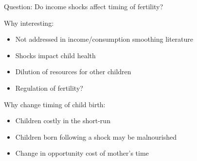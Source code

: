 \documentclass[red]{beamer}
\begin{document}
\begin{frame}{Question: Do income shocks affect timing of fertility?}

Why interesting:
\begin{itemize}
\item Not addressed in  income/consumption smoothing literature 
\item Shocks impact child health
\item Dilution of resources for other children
\item Regulation of fertility?
\end{itemize}

\bigskip

Why change timing of child birth:
\begin{itemize}
\item Children costly in the short-run
\item Children born following a shock may be malnourished
\item Change in opportunity cost of mother's time
\end{itemize}


\end{frame}


% 
% 
% 
% 
% 	

% 
% 
% 
% 
\end{document}
